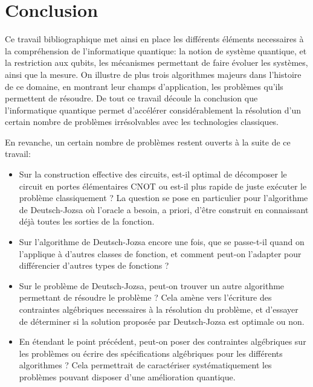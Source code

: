 \chapter{Conclusion}

Ce travail bibliographique met ainsi en place les différents éléments necessaires à la compréhension de l'informatique quantique: la notion de système quantique, et la restriction aux qubits, les mécanismes permettant de faire évoluer les systèmes, ainsi que la mesure. On illustre de plus trois algorithmes majeurs dans l'histoire de ce domaine, en montrant leur champs d'application, les problèmes qu'ils permettent de résoudre. De tout ce travail découle la conclusion que l'informatique quantique permet d'accélérer considérablement la résolution d'un certain nombre de problèmes irrésolvables avec les technologies classiques.

En revanche, un certain nombre de problèmes restent ouverts à la suite de ce travail:

\begin{itemize}
    \item Sur la construction effective des circuits, est-il optimal de décomposer le circuit en portes élémentaires CNOT ou est-il plus rapide de juste exécuter le problème classiquement ? La question se pose en particulier pour l'algorithme de Deutsch-Jozsa où l'oracle a besoin, a priori, d'être construit en connaissant déjà toutes les sorties de la fonction.
    \item Sur l'algorithme de Deutsch-Jozsa encore une fois, que se passe-t-il quand on l'applique à d'autres classes de fonction, et comment peut-on l'adapter pour différencier d'autres types de fonctions ?
    \item Sur le problème de Deutsch-Jozsa, peut-on trouver un autre algorithme permettant de résoudre le problème ? Cela amène vers l'écriture des contraintes algébriques necessaires à la résolution du problème, et d'essayer de déterminer si la solution proposée par Deutsch-Jozsa est optimale ou non.
    \item En étendant le point précédent, peut-on poser des contraintes algébriques sur les problèmes ou écrire des spécifications algébriques pour les différents algorithmes ? Cela permettrait de caractériser systématiquement les problèmes pouvant disposer d'une amélioration quantique.
\end{itemize}